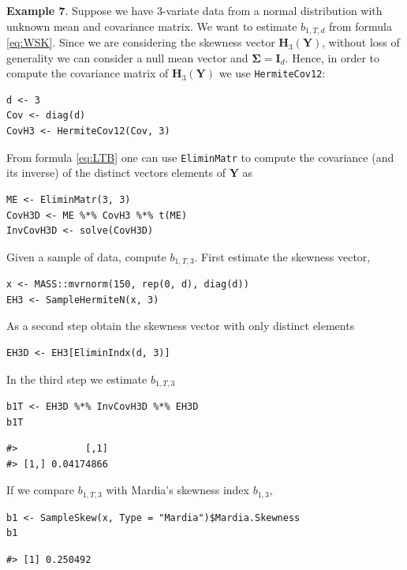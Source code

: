 \textbf{Example 7}. Suppose we have \(3\)-variate data from a normal distribution with unknown mean and covariance matrix. We want to estimate \(b_{1,T,d}\) from formula \eqref{eq:WSK}. Since we are considering the skewness vector \(\mathbf{H}_3(\mathbf{Y})\), without loss of generality we can consider a null mean vector and \(\boldsymbol{\Sigma}= \mathbf{I}_d\). Hence, in order to compute the covariance matrix of \(\mathbf{H}_3(\mathbf{Y})\) we use \texttt{HermiteCov12}:

\begin{verbatim}
d <- 3
Cov <- diag(d)
CovH3 <- HermiteCov12(Cov, 3)
\end{verbatim}

From formula \eqref{eq:LTB} one can use \texttt{EliminMatr} to compute the covariance (and its inverse) of the distinct vectors elements of \(\mathbf{Y}\) as

\begin{verbatim}
ME <- EliminMatr(3, 3)
CovH3D <- ME %*% CovH3 %*% t(ME)
InvCovH3D <- solve(CovH3D)
\end{verbatim}

Given a sample of data, compute \(b_{1,T,3}\). First estimate the skewness vector,

\begin{verbatim}
x <- MASS::mvrnorm(150, rep(0, d), diag(d))
EH3 <- SampleHermiteN(x, 3)
\end{verbatim}

As a second step obtain the skewness vector with only distinct elements

\begin{verbatim}
EH3D <- EH3[EliminIndx(d, 3)]
\end{verbatim}

In the third step we estimate \(b_{1,T,3}\)

\begin{verbatim}
b1T <- EH3D %*% InvCovH3D %*% EH3D
b1T
\end{verbatim}

\begin{verbatim}
#>            [,1]
#> [1,] 0.04174866
\end{verbatim}

If we compare \(b_{1,T,3}\) with Mardia's skewness index \(b_{1,3}\),

\begin{verbatim}
b1 <- SampleSkew(x, Type = "Mardia")$Mardia.Skewness
b1
\end{verbatim}

\begin{verbatim}
#> [1] 0.250492
\end{verbatim}

